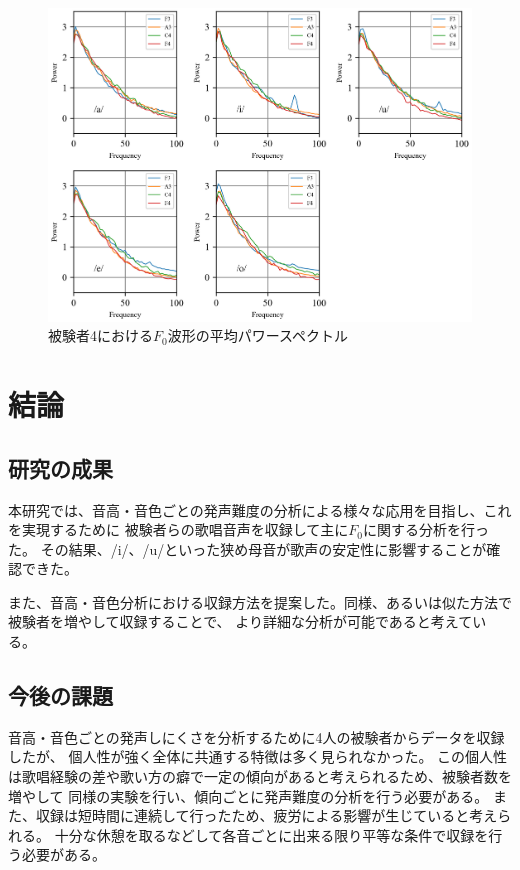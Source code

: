 \documentclass[10.5ptj,a4j,dvipdfmx,uplatex, oneside, openany, report]{jsbook}%
\begin{document}
\begin{figure}[thbp]
    \begin{center}
      \includegraphics[clip,width=12.0cm]{long_spectrogram_4.png}
      \caption{被験者4における$F_0$波形の平均パワースペクトル}
      \label{long_spectrogram_4}
    \end{center}
\end{figure}




\chapter{結論}
\section{研究の成果}
本研究では、音高・音色ごとの発声難度の分析による様々な応用を目指し、これを実現するために
被験者らの歌唱音声を収録して主に$F_0$に関する分析を行った。
その結果、/i/、/u/といった狭め母音が歌声の安定性に影響することが確認できた。

また、音高・音色分析における収録方法を提案した。同様、あるいは似た方法で被験者を増やして収録することで、
より詳細な分析が可能であると考えている。
\section{今後の課題}

音高・音色ごとの発声しにくさを分析するために4人の被験者からデータを収録したが、
個人性が強く全体に共通する特徴は多く見られなかった。
この個人性は歌唱経験の差や歌い方の癖で一定の傾向があると考えられるため、被験者数を増やして
同様の実験を行い、傾向ごとに発声難度の分析を行う必要がある。
また、収録は短時間に連続して行ったため、疲労による影響が生じていると考えられる。
十分な休憩を取るなどして各音ごとに出来る限り平等な条件で収録を行う必要がある。
\end{document}
